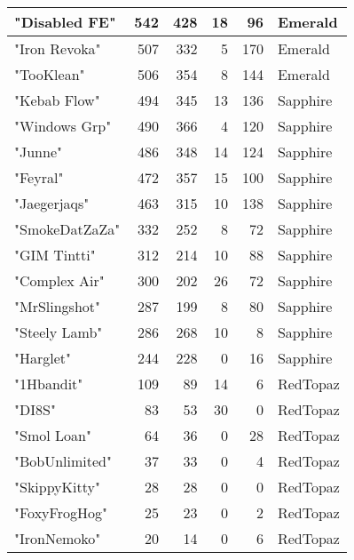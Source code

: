 \documentclass{article}
\begin{document}
\begin{table}[htbp]
\begin{tabular}{|l|r|r|r|r|l|}
"Disabled FE" & 542 & 428 & 18 & 96 & Emerald \\ \hline
"Iron Revoka" & 507 & 332 & 5 & 170 & Emerald \\ \hline
"TooKlean" & 506 & 354 & 8 & 144 & Emerald \\ \hline
"Kebab Flow" & 494 & 345 & 13 & 136 & Sapphire \\ \hline
"Windows Grp" & 490 & 366 & 4 & 120 & Sapphire \\ \hline
"Junne" & 486 & 348 & 14 & 124 & Sapphire \\ \hline
"Feyral" & 472 & 357 & 15 & 100 & Sapphire \\ \hline
"Jaegerjaqs" & 463 & 315 & 10 & 138 & Sapphire \\ \hline
"SmokeDatZaZa" & 332 & 252 & 8 & 72 & Sapphire \\ \hline
"GIM Tintti" & 312 & 214 & 10 & 88 & Sapphire \\ \hline
"Complex Air" & 300 & 202 & 26 & 72 & Sapphire \\ \hline
"MrSlingshot" & 287 & 199 & 8 & 80 & Sapphire \\ \hline
"Steely Lamb" & 286 & 268 & 10 & 8 & Sapphire \\ \hline
"Harglet" & 244 & 228 & 0 & 16 & Sapphire \\ \hline
"1Hbandit" & 109 & 89 & 14 & 6 & RedTopaz \\ \hline
"DI8S" & 83 & 53 & 30 & 0 & RedTopaz \\ \hline
"Smol Loan" & 64 & 36 & 0 & 28 & RedTopaz \\ \hline
"BobUnlimited" & 37 & 33 & 0 & 4 & RedTopaz \\ \hline
"SkippyKitty" & 28 & 28 & 0 & 0 & RedTopaz \\ \hline
"FoxyFrogHog" & 25 & 23 & 0 & 2 & RedTopaz \\ \hline
"IronNemoko" & 20 & 14 & 0 & 6 & RedTopaz \\ \hline
\end{tabular}
\end{table}
\end{document}
